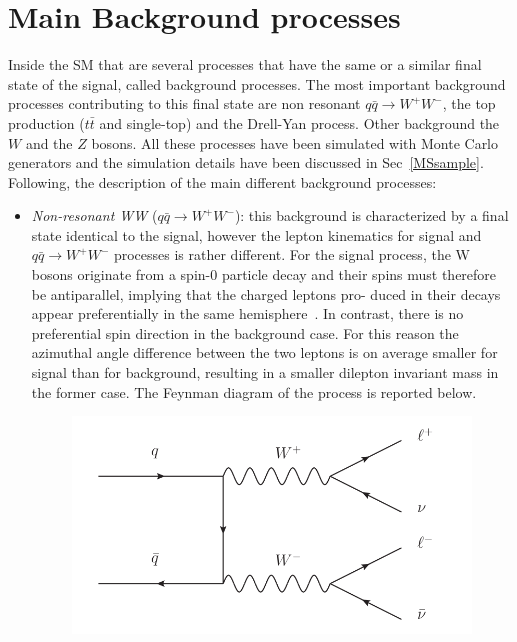 \section{Main Background processes}
\label{anbkg}
Inside the SM that are several processes that have the same or a similar final state of the signal, called background processes. The most important background processes contributing to this final state are non resonant $q\bar{q} \to W^+ W^-$, the top production ($t\bar{t}$ and single-top) and  the Drell-Yan process. 
Other background the $W$ and the $Z$ bosons.
All these processes have been simulated with Monte Carlo generators and the simulation details have been discussed in Sec~\ref{MSsample}.
Following, the description of the main different background processes:
\begin{itemize}
\item \textit{Non-resonant WW} ($q\bar{q} \to W^+ W^-$): this background is characterized by a final state identical to the signal, however the lepton kinematics for signal and $q\bar{q} \to W^+ W^-$ processes is rather different.
For the signal process, the W bosons originate from a spin-0 particle decay
and their spins must therefore be antiparallel, implying that the charged leptons pro-
duced in their decays appear preferentially in the same hemisphere~\cite{Ellis:2012wg}. In contrast,
there is no preferential spin direction in the background case. For this reason the
azimuthal angle difference between the two leptons is on average smaller for signal
than for background, resulting in a smaller dilepton invariant mass in the former case. The Feynman diagram of the process is reported below.
\begin{figure}[h]
\centering
\vspace{0.5cm}
\includegraphics[scale= 0.9]{../Cap5/nnr_WW}
\end{figure}

\end{itemize}
